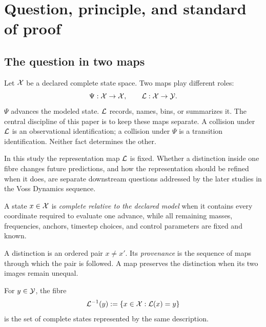 \section{Question, principle, and standard of proof}
\label{sec:principle}

\subsection{The question in two maps}

Let \(\mathcal X\) be a declared complete state space. Two maps play different roles:
\begin{equation}
  \Psi:\mathcal X\to\mathcal X,
  \qquad
  \mathcal L:\mathcal X\to\mathcal Y.
  \label{eq:two-map}
\end{equation}
\(\Psi\) advances the modeled state. \(\mathcal L\) records, names, bins, or summarizes it. The central discipline of this paper is to keep these maps separate. A collision under \(\mathcal L\) is an observational identification; a collision under \(\Psi\) is a transition identification. Neither fact determines the other.

In this study the representation map \(\mathcal L\) is fixed. Whether a distinction inside one fibre changes future predictions, and how the representation should be refined when it does, are separate downstream questions addressed by the later studies in the Voss Dynamics sequence.

\begin{definition}
A state \(x\in\mathcal X\) is \emph{complete relative to the declared model} when it contains every coordinate required to evaluate one advance, while all remaining masses, frequencies, anchors, timestep choices, and control parameters are fixed and known.
\end{definition}

\begin{definition}
A distinction is an ordered pair \(x\neq x'\). Its \emph{provenance} is the sequence of maps through which the pair is followed. A map preserves the distinction when its two images remain unequal.
\end{definition}

\begin{definition}
For \(y\in\mathcal Y\), the fibre
\begin{equation}
  \mathcal L^{-1}(y)
  :=
  \{x\in\mathcal X:\mathcal L(x)=y\}
  \label{eq:description-fibre}
\end{equation}
is the set of complete states represented by the same description.
\end{definition}

